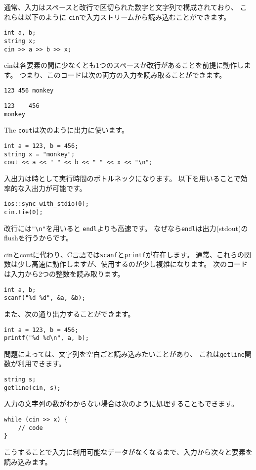 通常、入力はスペースと改行で区切られた数字と文字列で構成されており、
これらは以下のように
\texttt{cin}で入力ストリームから読み込むことができます。

\begin{lstlisting}
int a, b;
string x;
cin >> a >> b >> x;
\end{lstlisting}

cinは各要素の間に少なくとも1つのスペースか改行があることを前提に動作します。
つまり、このコードは次の両方の入力を読み取ることができます。

\begin{lstlisting}
123 456 monkey
\end{lstlisting}
\begin{lstlisting}
123    456
monkey
\end{lstlisting}
The \texttt{cout}は次のように出力に使います。
\begin{lstlisting}
int a = 123, b = 456;
string x = "monkey";
cout << a << " " << b << " " << x << "\n";
\end{lstlisting}

入出力は時として実行時間のボトルネックになります。
以下を用いることで効率的な入出力が可能です。

\begin{lstlisting}
ios::sync_with_stdio(0);
cin.tie(0);
\end{lstlisting}

改行には\texttt{"\textbackslash n"}を用いると
\texttt{endl}よりも高速です。
なぜなら\texttt{endl}は出力(stdout)のflushを行うからです。

cinとcoutに代わり、C言語では\texttt{scanf}と\texttt{printf}が存在します。
通常、これらの関数は少し高速に動作しますが、使用するのが少し複雑になります。
次のコードは入力から2つの整数を読み取ります。
\begin{lstlisting}
int a, b;
scanf("%d %d", &a, &b);
\end{lstlisting}
また、次の通り出力することができます。
\begin{lstlisting}
int a = 123, b = 456;
printf("%d %d\n", a, b);
\end{lstlisting}

問題によっては、文字列を空白ごと読み込みたいことがあり、
これは\texttt{getline}関数が利用できます。

\begin{lstlisting}
string s;
getline(cin, s);
\end{lstlisting}

入力の文字列の数がわからない場合は次のように処理することもできます。
\begin{lstlisting}
while (cin >> x) {
    // code
}
\end{lstlisting}
こうすることで入力に利用可能なデータがなくなるまで、入力から次々と要素を読み込みます。

